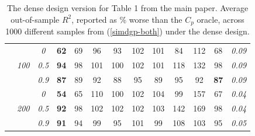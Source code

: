 \documentclass[12pt]{article}
\begin{document}
\begin{table}
\begin{center}
\begin{tabular}{ccc|cc|cc|cc|cc|c|c}
& & \it  0  & {\bf 62} & 69 & 96 & 93 & 102 & 101 & 84 & 112 & 68 & \it  0.09 \\
 & \it  100  & \it  0.5  & {\bf 94} & 98 & 101 & 100 & 102 & 101 & 118 & 132 & 98 & \it  0.09 \\
& & \it  0.9  & {\bf 87} & 89 & 92 & 88 & 95 & 89 & 95 & 92 & {\bf 87} & \it  0.09 \\[1ex]
\cline{2-3}\rule{0pt}{3ex}
& & \it  0  & {\bf 54} & 65 & 110 & 100 & 102 & 104 & 99 & 157 & 67 & \it  0.04 \\
 & \it  200  & \it  0.5  & {\bf 92} & 98 & 102 & 102 & 102 & 103 & 142 & 169 & 98 & \it  0.04 \\
& & \it  0.9  & {\bf 91} & 94 & 99 & 95 & 101 & 99 & 108 & 103 & 95 & \it  0.05 \\[1ex]
\hline
\end{tabular}
\end{center}
\caption{\label{tab:simdense} The dense design version for Table 1 from the main paper.  Average out-of-sample $R^2$, reported as  \% worse than the $C_p$ oracle, across 1000 different samples from (\ref{simdgp-both}) under the dense design. }  
\end{table}







\end{document}
